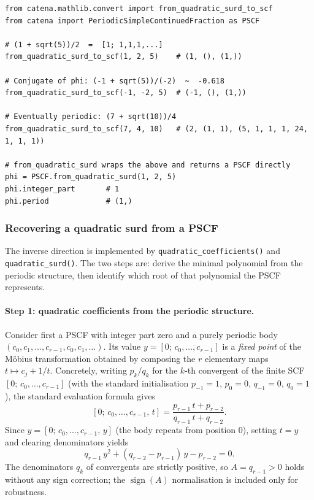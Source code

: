 \begin{catenadef}
\begin{lstlisting}[style=python]
from catena.mathlib.convert import from_quadratic_surd_to_scf
from catena import PeriodicSimpleContinuedFraction as PSCF

# (1 + sqrt(5))/2  =  [1; 1,1,1,...]
from_quadratic_surd_to_scf(1, 2, 5)    # (1, (), (1,))

# Conjugate of phi: (-1 + sqrt(5))/(-2)  ~  -0.618
from_quadratic_surd_to_scf(-1, -2, 5)  # (-1, (), (1,))

# Eventually periodic: (7 + sqrt(10))/4
from_quadratic_surd_to_scf(7, 4, 10)   # (2, (1, 1), (5, 1, 1, 1, 24, 1, 1, 1))

# from_quadratic_surd wraps the above and returns a PSCF directly
phi = PSCF.from_quadratic_surd(1, 2, 5)
phi.integer_part       # 1
phi.period             # (1,)
\end{lstlisting}
\end{catenadef}

\subsubsection{Recovering a quadratic surd from a PSCF}
\label{subsubsec:pscf-to-surd}

The inverse direction is implemented by \texttt{quadratic\_coefficients()} and
\texttt{quadratic\_surd()}.  The two steps are: derive the minimal polynomial
from the periodic structure, then identify which root of that polynomial the
PSCF represents.

\paragraph{Step 1: quadratic coefficients from the periodic structure.}
Consider first a PSCF with integer part zero and a purely periodic body
$(c_0, c_1, \ldots, c_{r-1}, c_0, c_1, \ldots)$.  Its value
$y = [0;\,\overline{c_0, \ldots, c_{r-1}}]$ is a \emph{fixed point} of the
M\"obius transformation obtained by composing the $r$ elementary maps
$t \mapsto c_j + 1/t$.  Concretely, writing $p_k/q_k$ for the $k$-th
convergent of the finite SCF $[0;\,c_0, \ldots, c_{r-1}]$ (with the standard
initialisation $p_{-1} = 1$, $p_0 = 0$, $q_{-1} = 0$, $q_0 = 1$), the
standard evaluation formula gives
\[
  [0;\,c_0,\ldots,c_{r-1},\,t] = \frac{p_{r-1}\,t + p_{r-2}}{q_{r-1}\,t + q_{r-2}}.
\]
Since $y = [0;\,c_0,\ldots,c_{r-1},\,y]$ (the body repeats from position $0$),
setting $t = y$ and clearing denominators yields
\[
  q_{r-1}\,y^2 + (q_{r-2} - p_{r-1})\,y - p_{r-2} = 0.
\]
The denominators $q_k$ of convergents are strictly positive, so
$A = q_{r-1} > 0$ holds without any sign correction; the
$\operatorname{sign}(A)$ normalisation is included only for robustness.

